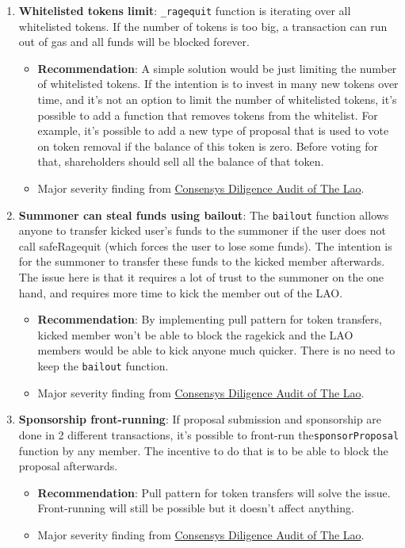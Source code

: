 \begin{enumerate}
\item\textbf{Whitelisted tokens limit}: \verb|_ragequit| function is iterating over all whitelisted tokens. If the number of tokens is too big, a transaction can run out of gas and all funds will be blocked forever.
	\begin{itemize}
	\item\textbf{Recommendation}: A simple solution would be just limiting the number of whitelisted tokens. If the intention is to invest in many new tokens over time, and it’s not an option to limit the number of whitelisted tokens, it’s possible to add a function that removes tokens from the whitelist. For example, it’s possible to add a new type of proposal that is used to vote on token removal if the balance of this token is zero. Before voting for that, shareholders should sell all the balance of that token.
	\item Major severity finding from \href{https://consensys.net/diligence/audits/2020/01/the-lao}{Consensys Diligence Audit of The Lao}.
	\end{itemize}

\item\textbf{Summoner can steal funds using bailout}: The \verb|bailout| function allows anyone to transfer kicked user’s funds to the summoner if the user does not call safeRagequit (which forces the user to lose some funds). The intention is for the summoner to transfer these funds to the kicked member afterwards. The issue here is that it requires a lot of trust to the summoner on the one hand, and requires more time to kick the member out of the LAO.
	\begin{itemize}
	\item\textbf{Recommendation}: By implementing pull pattern for token transfers, kicked member won’t be able to block the ragekick and the LAO members would be able to kick anyone much quicker. There is no need to keep the \verb|bailout| function.
	\item Major severity finding from \href{https://consensys.net/diligence/audits/2020/01/the-lao}{Consensys Diligence Audit of The Lao}.
	\end{itemize}

\item\textbf{Sponsorship front-running}: If proposal submission and sponsorship are done in 2 different transactions, it’s possible to front-run the\linebreak\verb|sponsorProposal| function by any member. The incentive to do that is to be able to block the proposal afterwards.
	\begin{itemize}
	\item\textbf{Recommendation}: Pull pattern for token transfers will solve the issue. Front-running will still be possible but it doesn’t affect anything.
	\item Major severity finding from \href{https://consensys.net/diligence/audits/2020/01/the-lao}{Consensys Diligence Audit of The Lao}.
	\end{itemize}


\end{enumerate}
